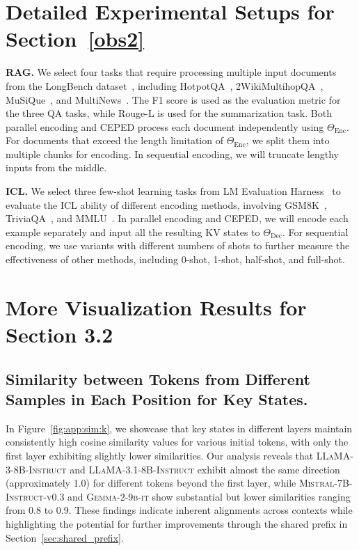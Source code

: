 \section{Detailed Experimental Setups for Section~\ref{obs2}}
\label{app:obs1}

\textbf{RAG.} We select four tasks that require processing multiple input documents from the LongBench dataset~\citep{bai2023longbench}, including HotpotQA~\citep{yang2018hotpotqa}, 2WikiMultihopQA~\citep{ho2020constructing}, MuSiQue~\citep{trivedi2022musique}, and MultiNews~\citep{fabbri2019multi}. The F1 score is used as the evaluation metric for the three QA tasks, while Rouge-L is used for the summarization task. Both parallel encoding and CEPED process each document independently using $\Theta_{\text{Enc}}$. For documents that exceed the length limitation of $\Theta_{\text{Enc}}$, we split them into multiple chunks for encoding. In sequential encoding, we will truncate lengthy inputs from the middle.

\textbf{ICL.} We select three few-shot learning tasks from LM Evaluation Harness~\citep{eval-harness} to evaluate the ICL ability of different encoding methods, involving GSM8K~\citep{gsm8k}, TriviaQA~\cite{joshi2017triviaqa}, and MMLU~\citep{mmlu}. In parallel encoding and CEPED, we will encode each example separately and input all the resulting KV states to $\Theta_{\text{Dec}}$. For sequential encoding, we use variants with different numbers of shots to further measure the effectiveness of other methods, including 0-shot, 1-shot, half-shot, and full-shot.

\section{More Visualization Results for Section 3.2}
\label{app:obs2}

\subsection{Similarity between Tokens from Different Samples in Each Position for Key States.}

In Figure~\ref{fig:app:sim:k}, we showcase that key states in different layers maintain consistently high cosine similarity values for various initial tokens, with only the first layer exhibiting slightly lower similarities. Our analysis reveals that \textsc{LLaMA-3-8B-Instruct} and \textsc{LLaMA-3.1-8B-Instruct} exhibit almost the same direction (approximately 1.0) for different tokens beyond the first layer, while \textsc{Mistral-7B-Instruct-v0.3} and \textsc{Gemma-2-9b-it} show substantial but lower similarities ranging from 0.8 to 0.9. These findings indicate inherent alignments across contexts while highlighting the potential for further improvements through the shared prefix in Section~\ref{sec:shared_prefix}.

